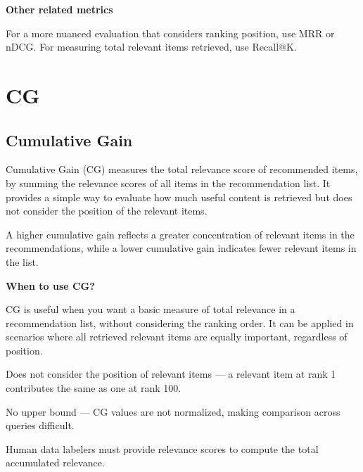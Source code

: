 \textbf{Other related metrics}

For a more nuanced evaluation that considers ranking position, use MRR or nDCG. For measuring total relevant items retrieved, use Recall@K.

\clearpage
\thispagestyle{rankingstyle}
\section{CG}
\subsection{Cumulative Gain}

Cumulative Gain (CG) measures the total relevance score of recommended items, by summing the relevance scores of all
items in the recommendation list. It provides a simple way to evaluate how much useful content is retrieved but
does not consider the position of the relevant items.

\begin{center}
\end{center}

A higher cumulative gain reflects a greater concentration of relevant items in the recommendations,
while a lower cumulative gain indicates fewer relevant items in the list.

\textbf{When to use CG?}

CG is useful when you want a basic measure of total relevance in a recommendation list, without considering the ranking order.
It can be applied in scenarios where all retrieved relevant items are equally important, regardless of position.


{
    \item Does not consider the position of relevant items — a relevant item at rank 1 contributes the same as one at rank 100.
    \item No upper bound — CG values are not normalized, making comparison across queries difficult.
    \item Human data labelers must provide relevance scores to compute the total accumulated relevance.
}

